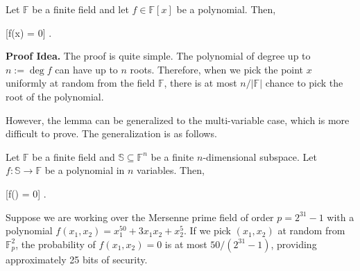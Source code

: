 \documentclass[../lecture-notes-148x210.tex]{subfiles}
\begin{document}
\vspace{-0.6mm}

\begin{lemma}\label{lemma:one-sz} Let
    $\mathbb{F}$ be a finite field and let $f \in \mathbb{F}[x]$ be a
    polynomial. Then,
    \begin{xequation}
        [f(x) = 0] \leq {}.
    \end{xequation}
\end{lemma}

\vspace{-0.6mm}

\textbf{Proof Idea.} The proof is quite simple. The polynomial of degree up to
$n:=\deg f$ can have up to $n$ roots. Therefore, when we pick the point $x$
uniformly at random from the field $\mathbb{F}$, there is at most $n/|\mathbb{F}|$
chance to pick the root of the polynomial.

However, the lemma can be generalized to the multi-variable case, which is more
difficult to prove. The generalization is as follows.

\vspace{-0.6mm}

\begin{lemma} \label{lemma:sz}
    Let $\mathbb{F}$ be a finite field and $\mathbb{S} \subseteq \mathbb{F}^n$ be a finite $n$-dimensional subspace.
    Let $f: \mathbb{S} \to \mathbb{F}$ be a polynomial in $n$ variables. Then,
    
    \vspace{-1.1mm}
    
    \begin{xequation}
        [f() = 0] \leq {}.
    \end{xequation}
\end{lemma}

\vspace{-4.1mm}

\begin{example}
Suppose we are working over the Mersenne prime field of order $p=2^{31}-1$ with
a polynomial $f(x_1,x_2) = x_1^{50} + 3x_1x_2 + x_2^5$. If we pick $(x_1,x_2)$
at random from $\mathbb{F}_p^2$, the probability of $f(x_1,x_2) = 0$ is at most
$50/(2^{31}-1)$, providing approximately 25 bits of security.
\end{example}
\end{document}
